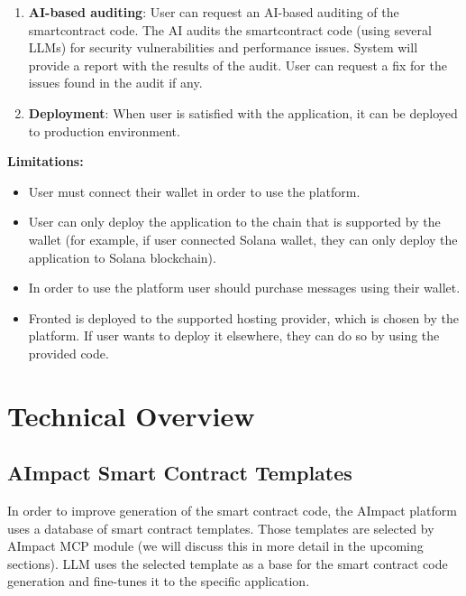 \documentclass[12pt,a4paper]{article}
\begin{document}
\begin{enumerate}
    \item \textbf{AI-based auditing}: 
    User can request an AI-based auditing of the smartcontract code.
    The AI audits the smartcontract code (using several LLMs) for security vulnerabilities and performance issues.
    System will provide a report with the results of the audit.
    User can request a fix for the issues found in the audit if any.
    
    
    \item \textbf{Deployment}: 
    When user is satisfied with the application, it can be deployed to production environment.

\end{enumerate}

\textbf{Limitations:}
\begin{itemize}
    \item User must connect their wallet in order to use the platform.
    \item User can only deploy the application to the chain that is supported by the wallet (for example, if user connected Solana wallet, they can only deploy the application to Solana blockchain).
    \item In order to use the platform user should purchase messages using their wallet.
    \item Fronted is deployed to the supported hosting provider, which is chosen by the platform. If user wants to deploy it elsewhere, they can do so by using the provided code.

\end{itemize}


\section{Technical Overview}
\label{sec:literature}


\subsection{AImpact Smart Contract Templates}

In order to improve generation of the smart contract code, the AImpact platform uses a database of smart contract templates. Those templates are 
selected by AImpact MCP module (we will discuss this in more detail in the upcoming sections).
LLM uses the selected template as a base for the smart contract code generation and fine-tunes it to the specific application.
\end{document}
